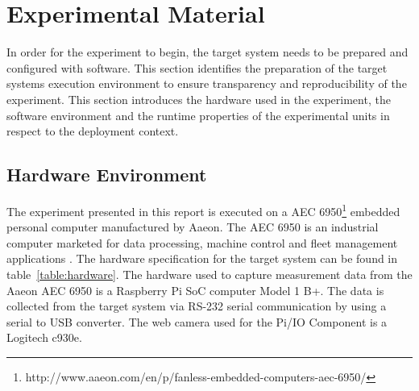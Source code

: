


\section{Experimental Material}
\label{section:exp-material}
In order for the experiment to begin, the target system needs to be prepared and configured with software. This section identifies the preparation of the target systems execution environment to ensure transparency and reproducibility of the experiment. This section introduces the hardware used in the experiment, the software environment and the runtime properties of the experimental units in respect to the deployment context. 

\subsection{Hardware Environment}
\label{section:hw-env}
The experiment presented in this report is executed on a AEC 6950\footnote{http://www.aaeon.com/en/p/fanless-embedded-computers-aec-6950/} embedded personal computer manufactured by Aaeon. The AEC 6950 is an industrial computer marketed for data processing, machine control and fleet management applications \cite{aaeon}. The hardware specification for the target system can be found in table~\ref{table:hardware}. The hardware used to capture measurement data from the Aaeon AEC 6950 is a Raspberry Pi SoC \cite{raspberry} computer Model 1 B+. The data is collected from the target system via RS-232 serial communication by using a serial to USB converter. The web camera used for the Pi/IO Component is a Logitech c930e.


